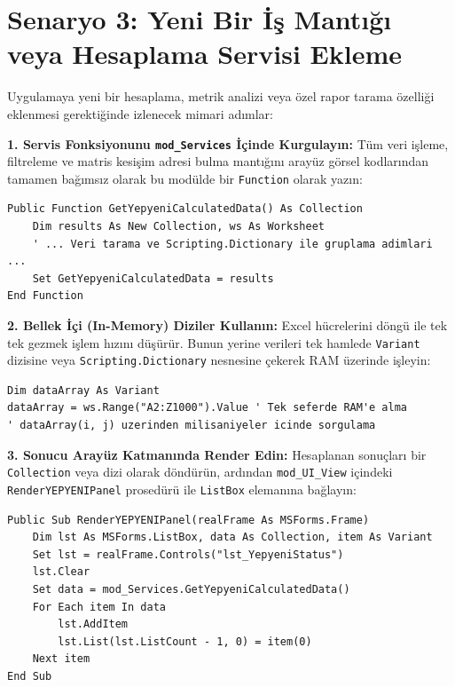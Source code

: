 \newpage

\section{Senaryo 3: Yeni Bir İş Mantığı veya Hesaplama Servisi Ekleme}

Uygulamaya yeni bir hesaplama, metrik analizi veya özel rapor tarama özelliği eklenmesi gerektiğinde izlenecek mimari adımlar:

\vspace{0.3cm}

\textbf{\textcolor{primary}{1. Servis Fonksiyonunu \texttt{mod\_Services} İçinde Kurgulayın:}}
Tüm veri işleme, filtreleme ve matris kesişim adresi bulma mantığını arayüz görsel kodlarından tamamen bağımsız olarak bu modülde bir \texttt{Function} olarak yazın:
\begin{lstlisting}[caption={Yeni Hesaplama Servis Fonksiyonu Örneği}]
Public Function GetYepyeniCalculatedData() As Collection
    Dim results As New Collection, ws As Worksheet
    ' ... Veri tarama ve Scripting.Dictionary ile gruplama adimlari ...
    Set GetYepyeniCalculatedData = results
End Function
\end{lstlisting}

\vspace{0.2cm}

\textbf{\textcolor{primary}{2. Bellek İçi (In-Memory) Diziler Kullanın:}}
Excel hücrelerini döngü ile tek tek gezmek işlem hızını düşürür. Bunun yerine verileri tek hamlede \texttt{Variant} dizisine veya \texttt{Scripting.Dictionary} nesnesine çekerek RAM üzerinde işleyin:
\begin{lstlisting}[caption={RAM Üzerinde Hızlı Veri İşleme}]
Dim dataArray As Variant
dataArray = ws.Range("A2:Z1000").Value ' Tek seferde RAM'e alma
' dataArray(i, j) uzerinden milisaniyeler icinde sorgulama
\end{lstlisting}

\vspace{0.2cm}

\textbf{\textcolor{primary}{3. Sonucu Arayüz Katmanında Render Edin:}}
Hesaplanan sonuçları bir \texttt{Collection} veya dizi olarak döndürün, ardından \texttt{mod\_UI\_View} içindeki \texttt{RenderYEPYENIPanel} prosedürü ile \texttt{ListBox} elemanına bağlayın:
\begin{lstlisting}[caption={ListBox Veri Bağlama (Rendering)}]
Public Sub RenderYEPYENIPanel(realFrame As MSForms.Frame)
    Dim lst As MSForms.ListBox, data As Collection, item As Variant
    Set lst = realFrame.Controls("lst_YepyeniStatus")
    lst.Clear
    Set data = mod_Services.GetYepyeniCalculatedData()
    For Each item In data
        lst.AddItem
        lst.List(lst.ListCount - 1, 0) = item(0)
    Next item
End Sub
\end{lstlisting}

